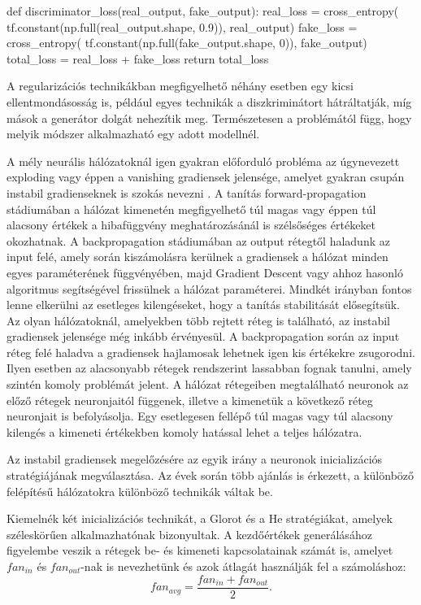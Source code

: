 \begin{python}
def discriminator_loss(real_output, fake_output):
    real_loss = cross_entropy(
    tf.constant(np.full(real_output.shape, 0.9)), real_output)
    fake_loss = cross_entropy(
    tf.constant(np.full(fake_output.shape, 0)), fake_output)
    total_loss = real_loss + fake_loss
    return total_loss
\end{python}

A regularizációs technikákban megfigyelhető néhány esetben egy kicsi ellentmondásosság is, például egyes technikák a diszkriminátort hátráltatják, míg mások a generátor dolgát nehezítik meg. Természetesen a problémától függ, hogy melyik módszer alkalmazható egy adott modellnél.



A mély neurális hálózatoknál igen gyakran előforduló probléma az úgynevezett exploding vagy éppen a vanishing gradiensek jelensége, amelyet gyakran csupán instabil gradienseknek is szokás nevezni \cite{geron2019hands}.
A tanítás forward-propagation stádiumában a hálózat kimenetén megfigyelhető túl magas vagy éppen túl alacsony értékek a hibafüggvény meghatározásánál is szélsőséges értékeket okozhatnak.
A backpropagation stádiumában az output rétegtől haladunk az input felé, amely során kiszámolásra kerülnek a gradiensek a hálózat minden egyes paraméterének függvényében, majd Gradient Descent vagy ahhoz hasonló algoritmus segítségével frissülnek a hálózat paraméterei. Mindkét irányban fontos lenne elkerülni az esetleges kilengéseket, hogy a tanítás stabilitását elősegítsük.
Az olyan hálózatoknál, amelyekben több rejtett réteg is található, az instabil gradiensek jelensége még inkább érvényesül. A backpropagation során az input réteg felé haladva a gradiensek hajlamosak lehetnek igen kis értékekre zsugorodni. Ilyen esetben az alacsonyabb rétegek rendszerint lassabban fognak tanulni, amely szintén komoly problémát jelent.
A hálózat rétegeiben megtalálható neuronok az előző rétegek neuronjaitól függenek, illetve a kimenetük a következő réteg neuronjait is befolyásolja. Egy esetlegesen fellépő túl magas vagy túl alacsony kilengés a kimeneti értékekben komoly hatással lehet a teljes hálózatra.

Az instabil gradiensek megelőzésére az egyik irány a neuronok inicializációs stratégiájának megválasztása.
Az évek során több ajánlás is érkezett, a különböző felépítésű hálózatokra különböző technikák váltak be.

Kiemelnék két inicializációs technikát, a Glorot \cite{glorot2010understanding} és a He \cite{he2015delving} stratégiákat, amelyek széleskörűen alkalmazhatónak bizonyultak.
A kezdőértékek generálásához figyelembe veszik a rétegek be- és kimeneti kapcsolatainak számát is, amelyet $fan_{in}$ és $fan_{out}$-nak is nevezhetünk és azok átlagát használják fel a számoláshoz:
$$fan_{avg} = \frac{fan_{in} + fan_{out}}{2}.$$

